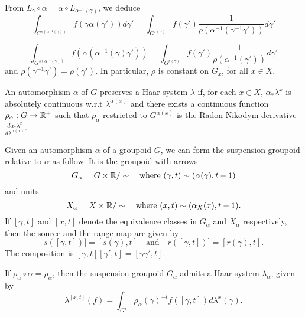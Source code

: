From $ L_\gamma \circ\alpha = \alpha \circ L_{\alpha^{-1}(\gamma)}$, we deduce 
\[
\int_{G^{s(\alpha^{-1}(\gamma))}} f(\gamma\alpha(\gamma')) d\gamma'= \int_{G^{r(\gamma)}} f(\gamma')\frac{1}{\rho(\alpha^{-1}(\gamma^{-1}\gamma'))}d\gamma'  
\]

\[\int_{G^{s(\alpha^{-1}(\gamma))}} f(\alpha(\alpha^{-1}(\gamma)\gamma')) = \int_{G^{r(\gamma)}}   f(\gamma')\frac {1}{\rho(\alpha^{-1}(\gamma'))} d\gamma'
\]
and $\rho(\gamma^{-1}\gamma')=\rho(\gamma')$. In particular, $\rho$ is constant on $G_x$, for all $x\in X$.
\begin{definition}
An automorphism $\alpha$ of $G$ preserves a Haar system $\lambda$ if, for each $x\in X$, $\alpha_* \lambda^x$ is absolutely continuous w.r.t $\lambda^{\alpha(x)}$ and there exists a continuous function $\rho_\alpha : G\rightarrow \mathbb R^+$ such that $\rho_\alpha$ restricted to $G^{\alpha(x)}$ is the Radon-Nikodym derivative $\frac{d\alpha_* \lambda^x}{d\lambda^{\alpha(x)}}$.\\
\end{definition}

\begin{definition}
Given an automorphism $\alpha$ of a groupoid $G$, we can form the suspension groupoid relative to $\alpha$ as follow. It is the groupoid with arrows
\[G_\alpha = G\times \mathbb R /\sim\quad\text{where }(\gamma,t)\sim(\alpha(\gamma),t-1)\]
and units
\[X_\alpha = X\times \mathbb R /\sim\quad\text{where }(x,t)\sim(\alpha_X(x),t-1).\]
If $[\gamma,t]$ and $[x,t]$ denote the equivalence classes in $G_\alpha$ and $X_\alpha$ respectively, then the source and the range map are given by
\[s([\gamma,t])]=[s(\gamma),t]\quad \text{and}\quad r([\gamma,t])]=[r(\gamma),t].\]
The composition is $[\gamma,t][\gamma',t]=[\gamma\gamma',t]$.
\end{definition}

\begin{lem}
If $\rho_\alpha \circ \alpha = \rho_\alpha$, then the suspension groupoid $G_\alpha$ admits a Haar system $\lambda_\alpha$, given by 
\[\lambda^{[x,t]}(f)=\int_{G^x} \rho_\alpha(\gamma)^{-t}f([\gamma,t])d\lambda^x(\gamma).\]
\end{lem}

